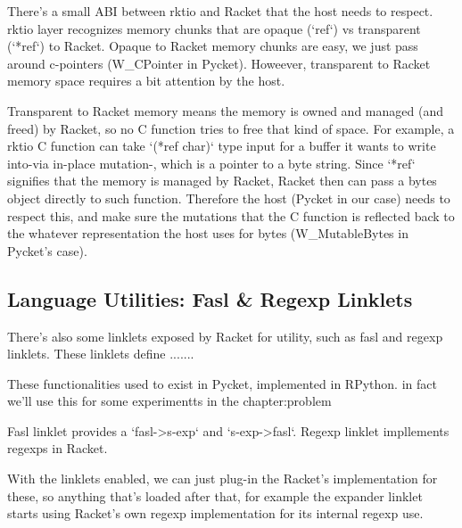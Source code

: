 				\begin{paragraph-here}%
					There's a small ABI between rktio and Racket that the host needs to respect. rktio layer recognizes memory chunks that are opaque (`ref`) vs transparent (`*ref`) to Racket. Opaque to Racket memory chunks are easy, we just pass around c-pointers (W\_CPointer in Pycket). Howeever, transparent to Racket memory space requires a bit attention by the host.
				\end{paragraph-here}

				\begin{paragraph-here}%
					Transparent to Racket memory means the memory is owned and managed (and freed) by Racket, so no C function tries to free that kind of space. For example, a rktio C function can take `(*ref char)` type input for a buffer it wants to write into-via in-place mutation-, which is a pointer to a byte string. Since `*ref` signifies that the memory is managed by Racket, Racket then can pass a bytes object directly to such function. Therefore the host (Pycket in our case) needs to respect this, and make sure the mutations that the C function is reflected back to the whatever representation the host uses for bytes (W\_MutableBytes in Pycket's case).
				\end{paragraph-here}

		\subsection{Language Utilities: Fasl \& Regexp Linklets}

			\begin{paragraph-here}%
				There's also some linklets exposed by Racket for utility, such as fasl and regexp linklets. These linklets define .......
			\end{paragraph-here}

			\begin{paragraph-here}%
				These functionalities used to exist in Pycket, implemented in RPython. in fact we'll use this for some experimentts in the chapter:problem
			\end{paragraph-here}

			\begin{paragraph-here}%
				Fasl linklet provides a `fasl->s-exp` and `s-exp->fasl`. Regexp linklet impllements regexps in Racket.
			\end{paragraph-here}

			\begin{paragraph-here}%
				With the linklets enabled, we can just plug-in the Racket's implementation for these, so anything that's loaded after that, for example the expander linklet starts using Racket's own regexp implementation for its internal regexp use.
			\end{paragraph-here}

